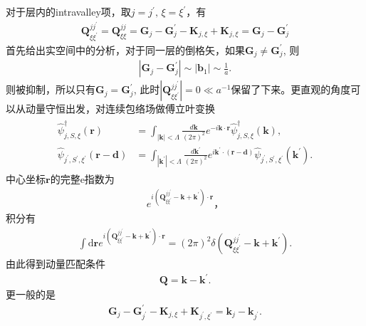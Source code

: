 \documentclass[10pt, oneside]{article}
\begin{document}
对于层内的intravalley项，取\(j = j^{\prime},\, \xi = \xi^{\prime}\)，有
\begin{align}
	\bm{Q}_{\xi \xi^{\prime}}^{j j^{\prime}} = \bm{Q}_{\xi \xi}^{j j} = \bm{G}_{j} - \bm{G}^{\prime}_{j} - \bm{K}_{j,\xi} + \bm{K}_{j,\xi} = \bm{G}_{j} - \bm{G}^{\prime}_{j}
\end{align}
首先给出实空间中的分析，对于同一层的倒格矢，如果\(\bm{G}_{j} \neq \bm{G}^{\prime}_{j}\), 则
\begin{align}
	\left|\bm{G}_{j} - \bm{G}^{\prime}_{j}\right| \sim \left|\bm{b}_{1}\right| \sim \frac{1}{a}.
\end{align}
则被抑制，所以只有\(\bm{G}_{j} = \bm{G}^{\prime}_{j}\), 此时\(\left|\bm{Q}_{\xi \xi^{\prime}}^{j j^{\prime}}\right| = 0 \ll a^{-1}\)保留了下来。更直观的角度可以从动量守恒出发，对连续包络场做傅立叶变换
\begin{align}
	\boxed{
		\begin{aligned}
			\hat{\psi}^{\dagger}_{j,S,\xi} \left(\bm{r}\right) &= \int_{\left|\bm{k}\right| < \Lambda} \frac{d \bm{k}}{\left(2 \pi\right)^{2}} e^{-i \bm{k} \cdot \bm{r}} \hat{\psi}^{\dagger}_{j,S,\xi} \left(\bm{k}\right) , \\
			\hat{\psi}_{j^{\prime}, S^{\prime}, \xi^{\prime}} \left(\bm{r} - \bm{d}\right) & = \int_{\left|\bm{k}^{\prime}\right| < \Lambda} \frac{d \bm{k}^{\prime}}{\left(2 \pi\right)^{2}} e^{i \bm{k}^{\prime} \cdot \left(\bm{r} - \bm{d}\right)} \hat{\psi}_{j^{\prime}, S^{\prime}, \xi^{\prime}} \left(\bm{k}^{\prime}\right). 
		\end{aligned}
	}
\end{align}
中心坐标\(\bm{r} \)的完整e指数为
\begin{align}
	e^{i \left(\bm{Q}_{\xi \xi^{\prime}}^{j j^{\prime}} - \bm{k} + \bm{k}^{\prime}\right) \cdot \bm{r}}，
\end{align}
积分有
\begin{align}
	\int \mathrm{d} \bm{r} e^{i \left(\bm{Q}_{\xi \xi^{\prime}}^{j j^{\prime}} - \bm{k} + \bm{k}^{\prime}\right) \cdot \bm{r}} = \left(2 \pi\right)^{2} \delta \left(\bm{Q}_{\xi \xi^{\prime}}^{j j^{\prime}} - \bm{k} + \bm{k}^{\prime}\right).
\end{align}
由此得到动量匹配条件
\begin{align}
	\boxed{
		\bm{Q} = \bm{k} - \bm{k}^{\prime}.
	}
\end{align}
更一般的是
\begin{align}
	\boxed{
		\bm{G}_{j} - \bm{G}^{\prime}_{j^{\prime}} - \bm{K}_{j,\xi} + \bm{K}_{j^{\prime},\xi^{\prime}} = \bm{k}_{j} - \bm{k}_{j^{\prime}}.
	}
\end{align}
\end{document}
